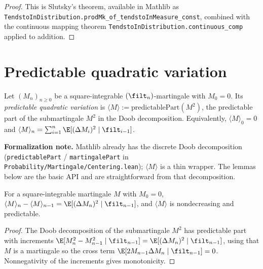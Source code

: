 \begin{proof}
This is Slutsky's theorem, available in Mathlib as
\texttt{TendstoInDistribution.prodMk\_of\_tendstoInMeasure\_const}, combined with
the continuous mapping theorem \texttt{TendstoInDistribution.continuous\_comp}
applied to addition.
\end{proof}

\section{Predictable quadratic variation}
\label{sec:pre_qv}

\begin{definition}\label{def:pred_qv}
\leanok
Let $(M_n)_{n\ge0}$ be a square-integrable $(\filt_n)$-martingale with $M_0 = 0$.
Its \emph{predictable quadratic variation} is
$\langle M\rangle := \mathrm{predictablePart}(M^2)$, the predictable part of the
submartingale $M^2$ in the Doob decomposition. Equivalently,
$\langle M\rangle_0 = 0$ and
$\langle M\rangle_n = \sum_{i=1}^n \E[(\Delta M_i)^2 \mid \filt_{i-1}]$.
\end{definition}

\textbf{Formalization note.} Mathlib already has the discrete Doob decomposition
(\texttt{predictablePart} / \texttt{martingalePart} in
\texttt{Probability/Martingale/Centering.lean}); $\langle M\rangle$ is a thin
wrapper. The lemmas below are the basic API and are straightforward from that
decomposition.

\begin{lemma}\label{lem:qv_incr}
\leanok
{}
For a square-integrable martingale $M$ with $M_0=0$,
$\langle M\rangle_n - \langle M\rangle_{n-1} = \E[(\Delta M_n)^2\mid\filt_{n-1}]$,
and $\langle M\rangle$ is nondecreasing and predictable.
\end{lemma}

\begin{proof}\leanok
The Doob decomposition of the submartingale $M^2$ has predictable part with
increments $\E[M_n^2 - M_{n-1}^2\mid\filt_{n-1}]
= \E[(\Delta M_n)^2\mid\filt_{n-1}]$, using that $M$ is a martingale so the cross
term $\E[2M_{n-1}\Delta M_n\mid\filt_{n-1}]=0$. Nonnegativity of the increments
gives monotonicity.
\end{proof}

